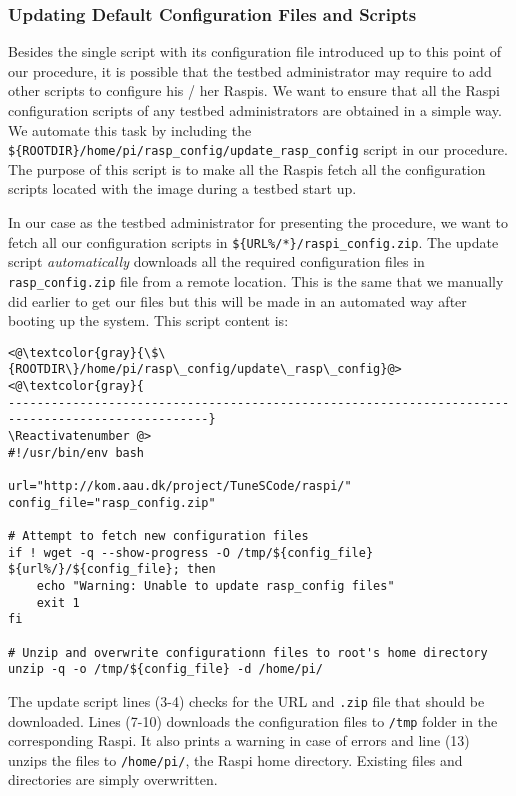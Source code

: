 \subsubsection{Updating Default Configuration Files and Scripts}
Besides the single script with its configuration file introduced up
to this point of our procedure, it is possible that the testbed
administrator may require to add other scripts to configure
his / her \ac{Raspi}s. We want
to ensure that all the \ac{Raspi} configuration scripts of any testbed
administrators are obtained in a simple way. We automate this task by
including the \texttt{\$\{ROOTDIR\}/home/pi/rasp\_config/update\_rasp\_config}
script in our procedure. The purpose of this script is to make all the
\ac{Raspi}s fetch all the configuration scripts located with the image
during a testbed start up.

In our case as the testbed administrator for presenting the procedure, we want
to fetch all our configuration scripts in
\texttt{\$\{URL\%/*\}/raspi\_config.zip}. The update script
\textit{automatically} downloads all the required configuration files in
\texttt{rasp\_config.zip} file from a remote location. This is the same that
we manually did earlier to get our files but this will be made in an
automated way after booting up the system. This script content is:

\Suppressnumber\begin{lstlisting}[]
<@\textcolor{gray}{\$\{ROOTDIR\}/home/pi/rasp\_config/update\_rasp\_config}@>
<@\textcolor{gray}{
--------------------------------------------------------------------------------------------------}
\Reactivatenumber @>
#!/usr/bin/env bash

url="http://kom.aau.dk/project/TuneSCode/raspi/"
config_file="rasp_config.zip"

# Attempt to fetch new configuration files
if ! wget -q --show-progress -O /tmp/${config_file} ${url%/}/${config_file}; then
    echo "Warning: Unable to update rasp_config files"
    exit 1
fi

# Unzip and overwrite configurationn files to root's home directory
unzip -q -o /tmp/${config_file} -d /home/pi/
\end{lstlisting}
\FloatBarrier
\vspace{-5mm}

The update script lines (3-4) checks for the \ac{URL} and \texttt{.zip} file that
should be downloaded. Lines (7-10) downloads the configuration files to \texttt{/tmp}
folder in the corresponding \ac{Raspi}. It also prints a warning in case of
errors and line (13) unzips the files to \texttt{/home/pi/}, the \ac{Raspi} home
directory. Existing files and directories are simply overwritten.

